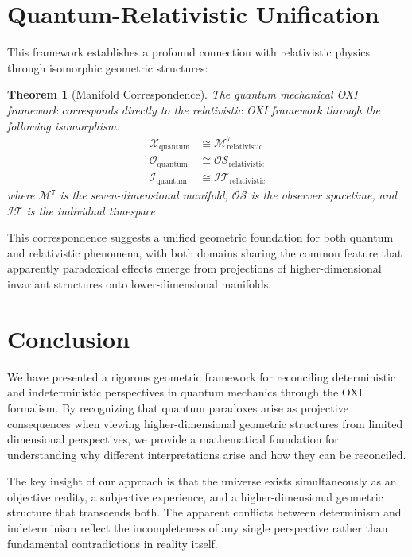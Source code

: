 \documentclass{article}
\newtheorem{theorem}{Theorem}
\begin{document}
\section{Quantum-Relativistic Unification}

This framework establishes a profound connection with relativistic physics through isomorphic geometric structures:

\begin{theorem}[Manifold Correspondence]
The quantum mechanical OXI framework corresponds directly to the relativistic OXI framework through the following isomorphism:
\begin{align}
\mathcal{X}_{\text{quantum}} &\cong \mathcal{M}^7_{\text{relativistic}} \\
\mathcal{O}_{\text{quantum}} &\cong \mathcal{OS}_{\text{relativistic}} \\
\mathcal{I}_{\text{quantum}} &\cong \mathcal{IT}_{\text{relativistic}}
\end{align}
where $\mathcal{M}^7$ is the seven-dimensional manifold, $\mathcal{OS}$ is the observer spacetime, and $\mathcal{IT}$ is the individual timespace.
\end{theorem}

This correspondence suggests a unified geometric foundation for both quantum and relativistic phenomena, with both domains sharing the common feature that apparently paradoxical effects emerge from projections of higher-dimensional invariant structures onto lower-dimensional manifolds.

\section{Conclusion}

We have presented a rigorous geometric framework for reconciling deterministic and indeterministic perspectives in quantum mechanics through the OXI formalism. By recognizing that quantum paradoxes arise as projective consequences when viewing higher-dimensional geometric structures from limited dimensional perspectives, we provide a mathematical foundation for understanding why different interpretations arise and how they can be reconciled.

The key insight of our approach is that the universe exists simultaneously as an objective reality, a subjective experience, and a higher-dimensional geometric structure that transcends both. The apparent conflicts between determinism and indeterminism reflect the incompleteness of any single perspective rather than fundamental contradictions in reality itself.
\end{document}
